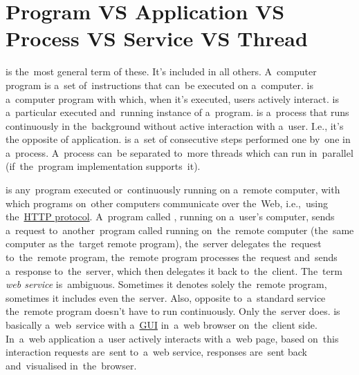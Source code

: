\section*{\fontsize{17}{17} \selectfont Program VS Application VS Process VS Service VS Thread}
\begin{itemize}
     is the~most general term of these.
            It's included in all others.
            A~computer program is a~set of~instructions that can~be executed on a~computer.
     is a~computer program with which, when it's executed, users actively interact.
     is a~particular executed and~running instance of a~program.
     is a~process that runs continuously in the~background without active interaction with a~user.
            I.e., it's the opposite of application.
     is a~set of consecutive steps performed one by~one in a~process.
            A~process can~be separated to~more threads which can run in~parallel (if~the~program implementation supports~it).
\end{itemize}

\label{webserviceapplication}
\begin{itemize}
     is any~program executed or~continuously running on a~remote computer, with which programs on~other computers communicate over the~Web, i.e.,~using the~\hyperref[http]{HTTP protocol}.
            A~program called \hyperref[clientserverarchitecture]{}, running on a~user's computer, sends a~request to~another~program called \hyperref[clientserverarchitecture]{} running on~the~remote computer (the~same computer as the~target remote program), the~server delegates the~request to~the~remote program, the~remote program processes the~request and~sends a~response to~the~server, which then delegates it back to~the~client.
            \warningnonl The~term \textit{web service} is~ambiguous.
            Sometimes it denotes solely the~remote program, sometimes it includes even the~server.
            Also, opposite to~a~standard service the~remote program doesn't have to run continuously.
            Only the~server does.
     is basically a~web~service with a~\hyperref[shellcligui]{GUI} in~a~web browser on~the~client side.
            In~a~web application a~user actively interacts with a~web page, based on~this interaction requests are~sent to~a~web service, responses are~sent back and~visualised in~the~browser.
\end{itemize}
\newpage
